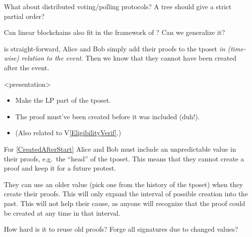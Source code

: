 \begin{frame}
  \begin{question}
    What about distributed voting/polling protocols?
    A tree should give a strict partial order?
  \end{question}
  \begin{question}
    Can linear blockchains also fit in the framework of 
    \textcite{BlockchainFreeCryptocurrencies}?
    Can we generalize it?
  \end{question}
\end{frame}

 is straight-forward, Alice and Bob simply add their 
proofs to the \ac{tposet} \emph{in (time-wise) relation to the event}.
Then we know that they cannot have been created after the event.

\begin{frame}<presentation>
  \begin{solution}
    \begin{itemize}
      \item Make the \ac{LP} part of the \ac{tposet}.
      \item The proof must've been created before it was included (duh!).
      \item (Also related to V\ref{EligibilityVerif}.)
    \end{itemize}
  \end{solution}
\end{frame}

For \cref{CreatedAfterStart} Alice and Bob must include an unpredictable value 
in their proofs, e.g.\ the \enquote{head} of the \ac{tposet}.
This means that they cannot create a proof and keep it for a future protest.

They can use an older value (pick one from the history of the \ac{tposet}) when 
they create their proofs.
This will only expand the interval of possible creation into the past.
This will not help their cause, as anyone will recognize that the proof could 
be created at any time in that interval.

\begin{frame}

  \pause

  \begin{question}
    How hard is it to reuse old proofs?
    Forge all signatures due to changed values?
  \end{question}
\end{frame}


